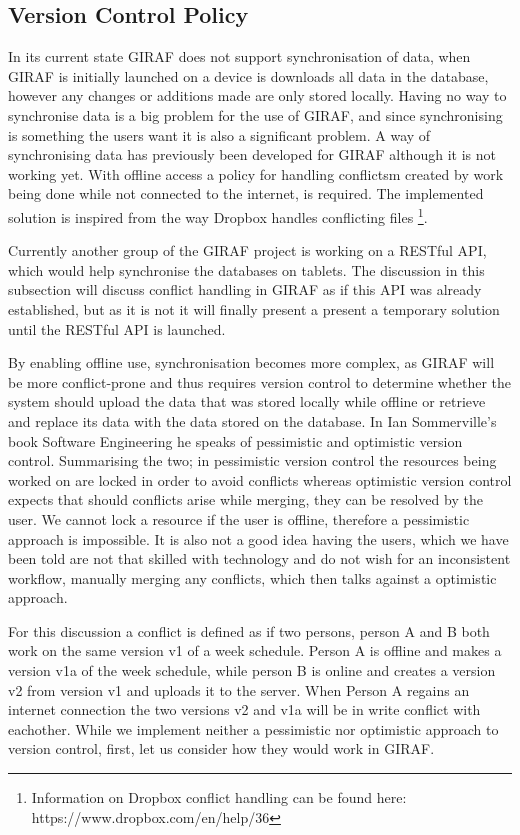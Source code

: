 \subsection{Version Control Policy}
In its current state GIRAF does not support synchronisation of data, when GIRAF is initially launched on a device is downloads all data in the database, however any changes or additions made are only stored locally.
Having no way to synchronise data is a big problem for the use of GIRAF, and since synchronising is something the users want it is also a significant problem.
A way of synchronising data has previously been developed for GIRAF although it is not working yet.
With offline access a policy for handling conflictsm created by work being done while not connected to the internet, is required. 
The implemented solution is inspired from the way Dropbox handles conflicting files \footnote{Information on Dropbox conflict handling can be found here: https://www.dropbox.com/en/help/36}. 

\bigskip
Currently another group of the GIRAF project is working on a RESTful API, which would help synchronise the databases on tablets.
The discussion in this subsection will discuss conflict handling in GIRAF as if this API was already established, but as it is not it will finally present a present a temporary solution until the RESTful API is launched.

By enabling offline use, synchronisation becomes more complex, as GIRAF will be more conflict-prone and thus requires version control to determine whether the system should upload the data that was stored locally while offline or retrieve and replace its data with the data stored on the database.
In Ian Sommerville's book Software Engineering \citep{SEBOOK} he speaks of pessimistic and optimistic version control.
Summarising the two; in pessimistic version control the resources being worked on are locked in order to avoid conflicts whereas optimistic version control expects that should conflicts arise while merging, they can be resolved by the user.
We cannot lock a resource if the user is offline, therefore a pessimistic approach is impossible.
It is also not a good idea having the users, which we have been told are not that skilled with technology and do not wish for an inconsistent workflow, manually merging any conflicts, which then talks against a optimistic approach.

\bigskip  \noindent
For this discussion a conflict is defined as if two persons, person A and B both work on the same version v1 of a week schedule.
Person A is offline and makes a version v1a of the week schedule, while person B is online and creates a version v2 from version v1 and uploads it to the server.
When Person A regains an internet connection the two versions v2 and v1a will be in write conflict with eachother.
While we implement neither a pessimistic nor optimistic approach to version control, first, let us consider how they would work in GIRAF. 


